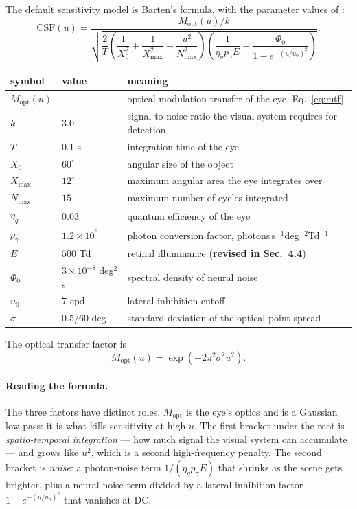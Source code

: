 \documentclass[11pt,a4paper]{article}
\newcommand{\cpd}{\mathrm{cpd}}
\begin{document}
The default sensitivity model is Barten's \citeyearpar{barten2003}
formula, with the parameter values of \citet[App.~A]{galinska2026csflow}:
\begin{equation}
  \mathrm{CSF}(u) =
  \frac{M_{\mathrm{opt}}(u)/k}
       {\sqrt{\dfrac{2}{T}\left(\dfrac{1}{X_0^2}+\dfrac{1}{X_{\max}^2}
              +\dfrac{u^2}{N_{\max}^2}\right)
              \left(\dfrac{1}{\eta_q p_{\!\gamma} E}
              +\dfrac{\Phi_0}{1-e^{-(u/u_0)^2}}\right)}} .
  \label{eq:barten}
\end{equation}
\begin{center}
\small
\begin{tabular}{@{}llL{7.7cm}@{}}
\toprule
symbol & value & meaning \\
\midrule
$M_{\mathrm{opt}}(u)$ & --- & optical modulation transfer of the eye, Eq.~\eqref{eq:mtf} \\
$k$ & $3.0$ & signal-to-noise ratio the visual system requires for detection \\
$T$ & $0.1$ s & integration time of the eye \\
$X_0$ & $60^\circ$ & angular size of the object \\
$X_{\max}$ & $12^\circ$ & maximum angular area the eye integrates over \\
$N_{\max}$ & $15$ & maximum number of cycles integrated \\
$\eta_q$ & $0.03$ & quantum efficiency of the eye \\
$p_{\!\gamma}$ & $1.2\times10^{6}$ & photon conversion factor, photons\,s$^{-1}$deg$^{-2}$Td$^{-1}$ \\
$E$ & $500$ Td & retinal illuminance (\textbf{revised in Sec.~4.4}) \\
$\Phi_0$ & $3\times10^{-8}$ deg$^2$s & spectral density of neural noise \\
$u_0$ & $7$ $\cpd$ & lateral-inhibition cutoff \\
$\sigma$ & $0.5/60$ deg & standard deviation of the optical point spread \\
\bottomrule
\end{tabular}
\end{center}
The optical transfer factor is
\begin{equation}
  M_{\mathrm{opt}}(u)=\exp\!\left(-2\pi^2\sigma^2u^2\right).
  \label{eq:mtf}
\end{equation}

\paragraph{Reading the formula.}
The three factors have distinct roles. $M_{\mathrm{opt}}$ is the eye's
optics and is a Gaussian low-pass: it is what kills sensitivity at high
$u$. The first bracket under the root is \emph{spatio-temporal integration}
--- how much signal the visual system can accumulate --- and grows like
$u^2$, which is a second high-frequency penalty. The second bracket is
\emph{noise}: a photon-noise term $1/(\eta_q p_{\!\gamma}E)$ that shrinks as
the scene gets brighter, plus a neural-noise term divided by a
lateral-inhibition factor $1-e^{-(u/u_0)^2}$ that vanishes at DC.
\end{document}
